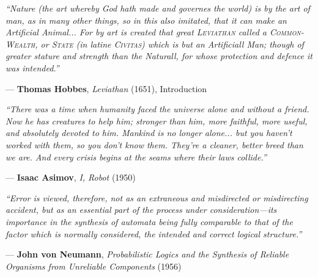 \documentclass[11pt,a4paper,twoside]{article}
\begin{document}
\clearpage\thispagestyle{empty}\pagecolor{hhpaper}\color{hhink}
\vspace*{\fill}
\noindent\begin{minipage}{0.95\textwidth}\normalsize\itshape
``Nature (the art whereby God hath made and governes the world) is by the art of man, as in many other things, so in this also imitated, that it can make an Artificial Animal... For by art is created that great \textsc{Leviathan} called a \textsc{Common-Wealth}, or \textsc{State} (in latine \textsc{Civitas}) which is but an Artificiall Man; though of greater stature and strength than the Naturall, for whose protection and defence it was intended.''
\par\vspace{7pt}
\raggedleft\upshape\small--- \textbf{Thomas Hobbes}, \emph{Leviathan} (1651), Introduction
\end{minipage}

\vspace{1.1cm}

\noindent\begin{minipage}{0.95\textwidth}\normalsize\itshape
``There was a time when humanity faced the universe alone and without a friend. Now he has creatures to help him; stronger than him, more faithful, more useful, and absolutely devoted to him. Mankind is no longer alone... but you haven't worked with them, so you don't know them. They're a cleaner, better breed than we are. And every crisis begins at the seams where their laws collide.''
\par\vspace{7pt}
\raggedleft\upshape\small--- \textbf{Isaac Asimov}, \emph{I, Robot} (1950)
\end{minipage}

\vspace{1.1cm}

\noindent\begin{minipage}{0.95\textwidth}\normalsize\itshape
``Error is viewed, therefore, not as an extraneous and misdirected or misdirecting accident, but as an essential part of the process under consideration---its importance in the synthesis of automata being fully comparable to that of the factor which is normally considered, the intended and correct logical structure.''
\par\vspace{7pt}
\raggedleft\upshape\small--- \textbf{John von Neumann}, \emph{Probabilistic Logics and the Synthesis of Reliable Organisms from Unreliable Components} (1956)
\end{minipage}
\vspace*{\fill}
\clearpage
\nopagecolor\color{hhink}
\end{document}
